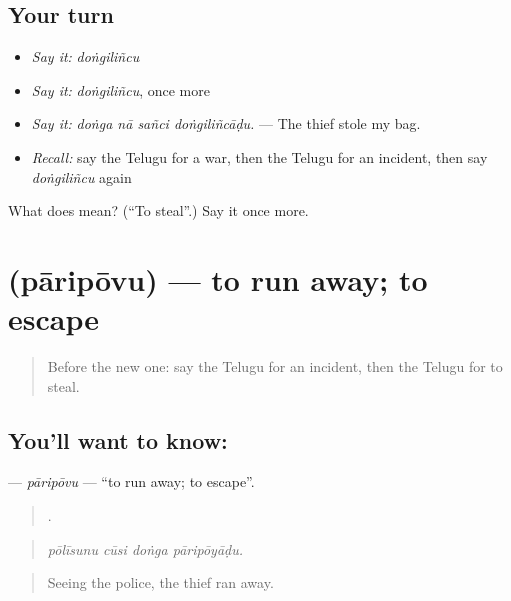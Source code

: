 \subsection*{Your turn}
\begin{itemize}
\raggedright
  \item \emph{Say it:} \emph{doṅgiliñcu}
  \item \emph{Say it:} \emph{doṅgiliñcu}, once more
  \item \emph{Say it:} \emph{doṅga nā sañci doṅgiliñcāḍu.} — The thief stole my bag.
  \item \emph{Recall:} say the Telugu for a war, then the Telugu for an incident, then say \emph{doṅgiliñcu} again
\end{itemize}

\begin{tcolorbox}[breakable,colback=teal!4,colframe=teal!35!black,title={Before you move on}]
What does  mean? (\textquotedblleft{}To steal\textquotedblright{}.) Say it once more.
\end{tcolorbox}
\section[\texorpdfstring{\te{పారిపోవు} (pāripōvu)}{పారిపోవు (pāripōvu)}]{ (pāripōvu) — to run away; to escape}

\label{lesson:TE-C326-paripovu}



\begin{quote}
Before the new one: say the Telugu for an incident, then the Telugu for to steal.
\end{quote}

\subsection*{You'll want to know: }
\textbf{} — \emph{pāripōvu} — \textquotedblleft{}to run away; to escape\textquotedblright{}.

\begin{quote}
   .
\end{quote}

\begin{quote}
\emph{pōlīsunu cūsi doṅga pāripōyāḍu.}
\end{quote}

\begin{quote}
Seeing the police, the thief ran away.
\end{quote}


